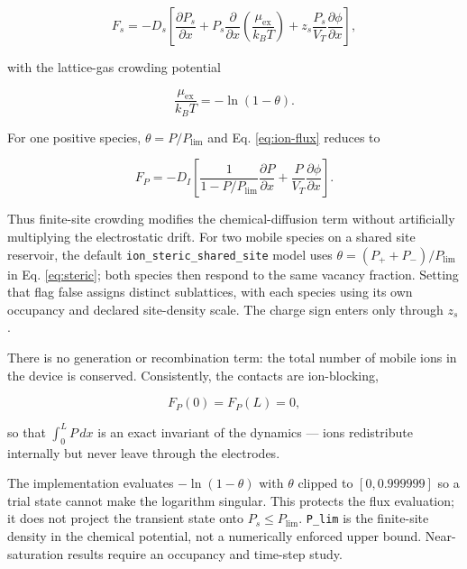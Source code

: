 \documentclass[
  11pt,
  american,
]{report}
\begin{document}
\begin{equation}
\label{eq:ion-flux}
F_s=-D_s\left[
\frac{\partial P_s}{\partial x}
+P_s\frac{\partial}{\partial x}
\left(\frac{\mu_\mathrm{ex}}{k_BT}\right)
+z_s\frac{P_s}{V_T}\frac{\partial\phi}{\partial x}
\right],
\end{equation}

with the lattice-gas crowding potential

\begin{equation}
\label{eq:steric}
\frac{\mu_\mathrm{ex}}{k_BT}=-\ln(1-\theta).
\end{equation}

For one positive species, \(\theta=P/P_\mathrm{lim}\) and Eq.
\ref{eq:ion-flux} reduces to

\begin{equation}
\label{eq:ion-flux-single}
F_P=-D_I\left[
\frac{1}{1-P/P_\mathrm{lim}}\frac{\partial P}{\partial x}
+\frac{P}{V_T}\frac{\partial\phi}{\partial x}
\right].
\end{equation}

Thus finite-site crowding modifies the chemical-diffusion term without
artificially multiplying the electrostatic drift. For two mobile species
on a shared site reservoir, the default
\texttt{ion\_steric\_shared\_site} model uses
\(\theta=(P_+ + P_-)/P_\mathrm{lim}\) in Eq. \ref{eq:steric}; both
species then respond to the same vacancy fraction. Setting that flag
false assigns distinct sublattices, with each species using its own
occupancy and declared site-density scale. The charge sign enters only
through \(z_s\).

There is no generation or recombination term: the total number of mobile
ions in the device is conserved. Consistently, the contacts are
ion-blocking,

\begin{equation}
\label{eq:ion-zero-flux}
F_P(0)=F_P(L)=0,
\end{equation}

so that \(\int_0^L P\,dx\) is an exact invariant of the dynamics ---
ions redistribute internally but never leave through the electrodes.

The implementation evaluates \(-\ln(1-\theta)\) with \(\theta\) clipped
to \([0,0.999999]\) so a trial state cannot make the logarithm singular.
This protects the flux evaluation; it does not project the transient
state onto \(P_s\le P_\mathrm{lim}\). \texttt{P\_lim} is the finite-site
density in the chemical potential, not a numerically enforced upper
bound. Near-saturation results require an occupancy and time-step study.
\end{document}
